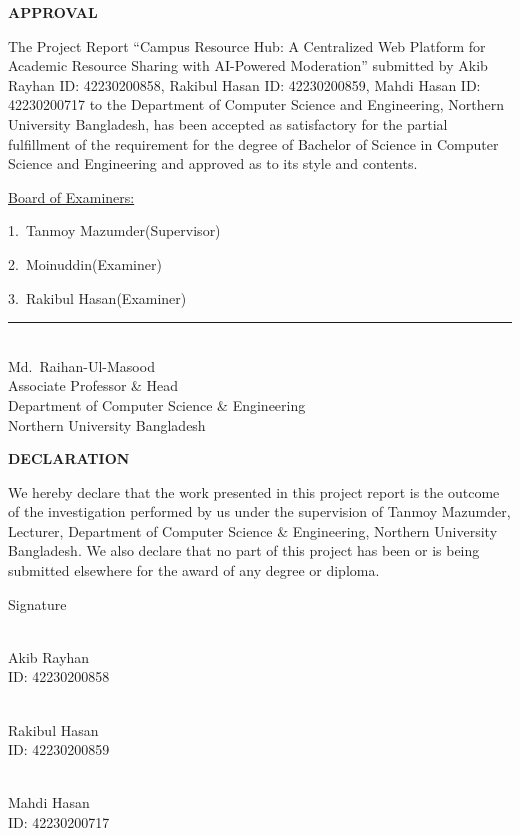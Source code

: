\documentclass[12pt,a4paper]{report}
\newcommand{\ProjectTitle}{Campus Resource Hub: A Centralized Web Platform for Academic Resource Sharing with AI-Powered Moderation}
\newcommand{\StudentAName}{Akib Rayhan}
\newcommand{\StudentAID}{42230200858}
\newcommand{\StudentBName}{Rakibul Hasan}
\newcommand{\StudentBID}{42230200859}
\newcommand{\StudentCName}{Mahdi Hasan}
\newcommand{\StudentCID}{42230200717}
\newcommand{\SupervisorName}{Tanmoy Mazumder}
\newcommand{\SupervisorRank}{Lecturer}
\newcommand{\ExaminerAName}{Moinuddin}
\newcommand{\ExaminerBName}{Rakibul Hasan}
\newcommand{\DeptHeadName}{Md.\ Raihan-Ul-Masood}
\newcommand{\frontheading}[1]{%
  \begin{center}\textbf{\Large #1}\end{center}\vspace{10pt}}
\begin{document}

\frontheading{APPROVAL}
The Project Report ``\ProjectTitle'' submitted by \StudentAName{}
ID: \StudentAID, \StudentBName{} ID: \StudentBID, \StudentCName{}
ID: \StudentCID{} to the Department of Computer Science and
Engineering, Northern University Bangladesh, has been accepted as
satisfactory for the partial fulfillment of the requirement for the
degree of Bachelor of Science in Computer Science and Engineering and
approved as to its style and contents.

\vspace{1.4cm}
\underline{Board of Examiners:}

\vspace{0.8cm}
1.\ \SupervisorName \hfill (Supervisor)

\vspace{1.6cm}
2.\ \ExaminerAName \hfill (Examiner)

\vspace{1.6cm}
3.\ \ExaminerBName \hfill (Examiner)

\vfill
\begin{center}
  \rule{6cm}{0.4pt}\\
  \DeptHeadName\\
  Associate Professor \& Head\\
  Department of Computer Science \& Engineering\\
  Northern University Bangladesh
\end{center}
\clearpage

\frontheading{DECLARATION}
We hereby declare that the work presented in this project report is
the outcome of the investigation performed by us under the
supervision of \SupervisorName, \SupervisorRank, Department of
Computer Science \& Engineering, Northern University Bangladesh. We
also declare that no part of this project has been or is being
submitted elsewhere for the award of any degree or diploma.

\vspace{1.4cm}
\begin{center}
  Signature
  \vspace{1.2cm}

  \makebox[0.5\textwidth]{\dotfill}\\
  \StudentAName\\
  ID: \StudentAID
  \vspace{1.2cm}

  \makebox[0.5\textwidth]{\dotfill}\\
  \StudentBName\\
  ID: \StudentBID
  \vspace{1.2cm}

  \makebox[0.5\textwidth]{\dotfill}\\
  \StudentCName\\
  ID: \StudentCID
\end{center}
\clearpage
\end{document}
